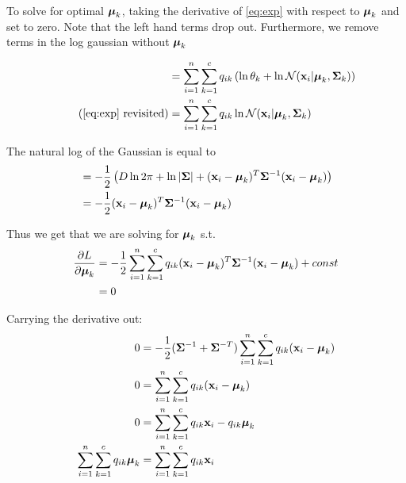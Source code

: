 \documentclass[a4paper, 12pt]{article}
\newcommand{\bx}{\mathbf{x}} %
\begin{document}
\begin{itemize}
\begin{itemize}
                To solve for optimal $\boldsymbol{\mu}_k$, taking the derivative of \cref{eq:exp} with respect
                to $\boldsymbol{\mu}_k$ and set to zero. Note that the left hand terms drop out. Furthermore, we
                remove terms in the log gaussian without $\boldsymbol{\mu}_k$ 

                \begin{align*}
                    &= \sum_{i=1}^n \sum_{k=1}^c q_{ik} \left(\ln\theta_k + 
                \ln \mathcal{N}(\bx_i | \bmu_k, \bSigma_k )\right) \\ \tag{\ref{eq:exp} revisited}
                    &= \sum_{i=1}^n \sum_{k=1}^c q_{ik} \ln \mathcal{N}(\bx_i | \bmu_k, \bSigma_k)
               \end{align*}

                The natural log of the Gaussian is equal to 
                \begin{align}
                 &= - \frac{1}{2} \left( D \ln2\pi + \ln|\bSigma| + (\bx_i - \bmu_k)^T
                 \bSigma^{-1} (\bx_i-\bmu_k) \right)\label{eq:lngauss} \\
                 &= - \frac{1}{2} (\bx_i - \bmu_k)^T \bSigma^{-1} (\bx_i-\bmu_k)
                \end{align}


                Thus we get that we are solving for $\boldsymbol{\mu}_k$ s.t.
                \begin{align}
                    \frac{\partial L}{\partial \bmu_k} &=  - \frac{1}{2} \sum_{i=1}^n \sum_{k=1}^c q_{ik} 
                     (\bx_i - \bmu_k)^T \bSigma^{-1} (\bx_i-\bmu_k) + const \\
                     &= 0
                \end{align}

                Carrying the derivative out:  %
                \begin{align}
                    0  &=  - \frac{1}{2} (\bSigma^{-1}  + \bSigma^{-T} )
                    \sum_{i=1}^n \sum_{k=1}^c q_{ik} (\bx_i - \bmu_k) \\
                    0 &= \sum_{i=1}^n \sum_{k=1}^c q_{ik} (\bx_i - \bmu_k) \\
                    0 &= \sum_{i=1}^n \sum_{k=1}^c q_{ik} \bx_i - q_{ik} \bmu_k \\
                    \sum_{i=1}^n \sum_{k=1}^c q_{ik} \bmu_k  &= \sum_{i=1}^n \sum_{k=1}^c q_{ik} \bx_i \\
                \end{align}


\end{itemize}
\end{itemize}
\end{document}
